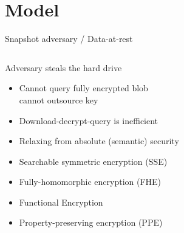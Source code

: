 \section{Model}

	\begin{frame}{Snapshot adversary / Data-at-rest}

		\begin{columns}[T,onlytextwidth]

				\begin{block}{Adversary steals the hard drive}

					\begin{itemize}
						\item<1-> Cannot query fully encrypted blob \\ \small{cannot outsource key}
						\item<1-> Download-decrypt-query is inefficient
						\item<1-> Relaxing from absolute (semantic) security
						\item<2-> Searchable symmetric encryption (SSE)~\cite{sse-improved}
						\item<3-> Fully-homomorphic encryption (FHE)~\cite{fhe}
						\item<4-> Functional Encryption~\cite{functional-encryption}
						\item<5-> Property-preserving encryption (PPE)~\cite{ope-original, ore-original}
					\end{itemize}

				\end{block}



		\end{columns}

	\end{frame}

